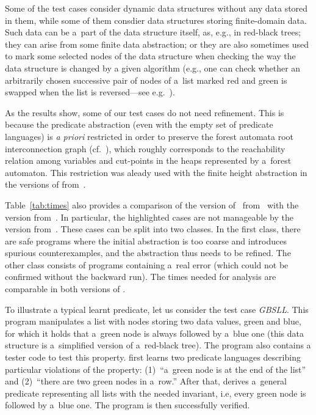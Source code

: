 {Some of the test cases consider dynamic data structures without any data stored
in them, while some of them consdier data structures storing finite-domain data.
Such data can
be a~part of the data structure itself, as, e.g., in red-black trees; they can
arise from some finite data abstraction; or they are also sometimes used to
mark some selected nodes of the data structure when checking the way the data
structure is changed by a given algorithm (e.g., one can check whether an
arbitrarily chosen successive pair of nodes of a~list marked red and green is
swapped when the list is reversed---see e.g.~\cite{artmc}).

As the results show, some of our test cases do not need refinement.
This is because the predicate abstraction (even with the empty set of predicate
languages) is \emph{a priori} restricted in order to preserve the forest automata root interconnection graph (cf.\ ),
which roughly corresponds to the reachability relation among variables and
cut-points in the heaps represented by a~forest automaton.
This restriction was aleady used with the
finite height abstraction in the versions of \forester
from~\cite{habermehl:forest,boxes13}.

Table~\ref{tab:times} also provides a comparison of the version of~\forester
from~\cite{boxes13} with the version from~\cite{vmcai17}.
In particular, the highlighted cases are not manageable by the version from~\cite{boxes13}.
These cases can be split into two classes.
In the first class, there are safe programs where the initial abstraction is too
coarse and introduces spurious counterexamples, and the abstraction thus needs
to be refined.
The other class consists of programs 
containing a~real error (which could not be confirmed without the backward run).
The times needed for analysis are comparable in both versions of \forester.

To illustrate a typical learnt predicate, let us consider the test case \mbox{\emph{GBSLL}}.
This program manipulates a list with nodes storing two data values, green and blue, for which it holds
that a~green node is always followed by a~blue one (this data structure is
a~simplified version of a~red-black tree).
The program also contains a tester code to test this property.
\forester{} first learns two predicate languages describing particular violations of the property:
(1)~``a~green node is at the end of the list'' and
(2)~``there are two green nodes in a~row.''
After that, \forester{} derives a~general predicate representing all lists with
the needed invariant, i.e, every green node is followed by a~blue one.
The program is then successfully verified. 

}
